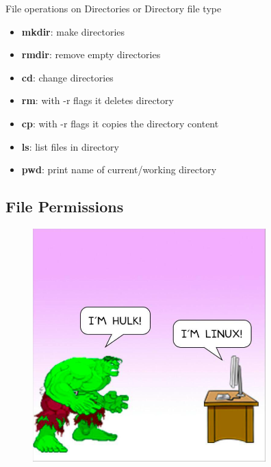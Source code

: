 \documentclass{beamer}
\begin{document}
    
    \begin{frame}{File operations} {on Directories  or Directory file type}
    

	\begin{itemize}
	
	 \item{
		        \textbf{mkdir}: make directories  
		        \pause
		  }
	
	\item{
		        \textbf{rmdir}: remove empty directories  
		        \pause
		  }
	\item{
		        \textbf{cd}: change directories
		        \pause
		  }
	
	\item{
		        \textbf{rm}: with -r flags it deletes directory   
		        \pause
		  }
	\item{
		        \textbf{cp}: with -r flags it copies the directory content	\pause
		  }
	\item{
		        \textbf{ls}: list files in directory
		        \pause
		  }	  
	\item{
		        \textbf{pwd}: print name of current/working directory
		  }
		  
		  
	
	\end{itemize}
	
\end{frame}

\subsection{File Permissions}

	\begin{figure}[htp]
    \centering
    \includegraphics[width=9cm, height=9cm]{hulk-vs-Linux.png}
    \end{figure}
    
\end{document}
